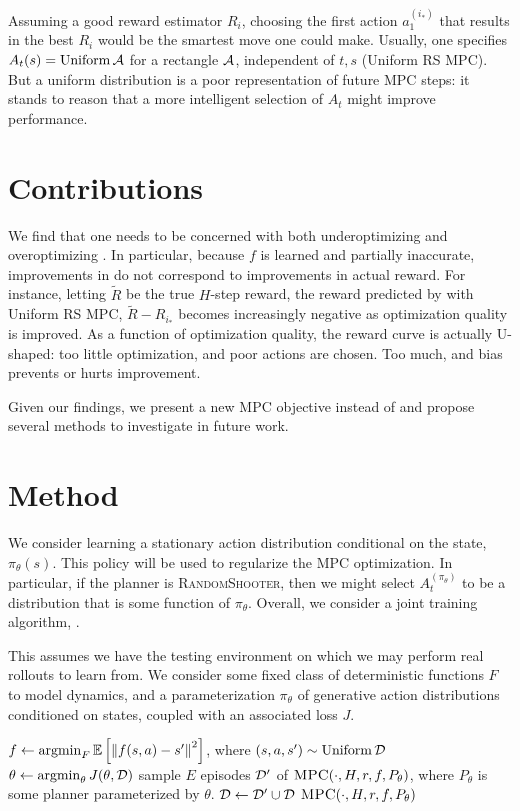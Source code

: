 \documentclass{article}
\let\Oldsection\section
\renewcommand{\section}{\FloatBarrier\Oldsection}
\begin{document}
Assuming a good reward estimator $R_i$, choosing the first action $a_1^{(i_*)}$ that results in the best $R_i$ would be the smartest move one could make. Usually, one specifies $A_t(s)=\operatorname{Uniform} \mathcal{A}$ for a rectangle $\mathcal{A}$, independent of $t,s$ (Uniform RS MPC). But a uniform distribution is a poor representation of future \textsc{MPC} steps: it stands to reason that a more intelligent selection of $A_t$ might improve performance.

\section{Contributions}

We find that one needs to be concerned with both underoptimizing and overoptimizing . In particular, because $f$ is learned and partially inaccurate, improvements in  do not correspond to improvements in actual reward. For instance, letting $\tilde R$ be the true $H$-step reward, the reward predicted by  with Uniform RS MPC, $\tilde R - R_{i_*}$ becomes increasingly negative as optimization quality is improved. As a function of optimization quality, the reward curve is actually U-shaped: too little optimization, and poor actions are chosen. Too much, and bias prevents or hurts improvement.

Given our findings, we present a new MPC objective instead of  and propose several methods to investigate in future work.

\section{Method}

We consider learning a stationary action distribution conditional on the state, $\pi_\theta(s)$. This policy will be used to regularize the MPC optimization. In particular, if the planner is \textsc{RandomShooter}, then we might select $A_t^{(\pi_\theta)}$ to be a distribution that is some function of $\pi_\theta$. Overall, we consider a joint training algorithm, .

\begin{algorithm}
\caption{This assumes we have the testing environment on which we may perform real rollouts to learn from. We consider some fixed class of deterministic functions $F$ to model dynamics, and a parameterization $\pi_\theta$ of generative action distributions conditioned on states, coupled with an associated loss $J$.} \label{alg:train}
\begin{algorithmic}[1]
\State $f\gets \operatorname*{argmin}_F\operatorname{\mathbb{E}}\left[{\left\lVert f(s,a)-s' \right\rVert^2}\right]$, where $(s,a,s')\sim\operatorname{Uniform}\mathcal{D}$
\State $\theta \gets \operatorname*{argmin}_\theta J(\theta, \mathcal{D})$
\State sample $E$ episodes $\mathcal{D}'$ of $\textsc{MPC}(\cdot,  H, r, f, P_\theta)$, where $P_\theta$ is some planner parameterized by $\theta$.
\State $\mathcal{D}\gets\mathcal{D}'\cup\mathcal{D}$
\EndFor
\State \Return $\textsc{MPC}(\cdot,  H, r, f, P_\theta)$
\EndProcedure
\end{algorithmic}
\end{algorithm}
\end{document}
